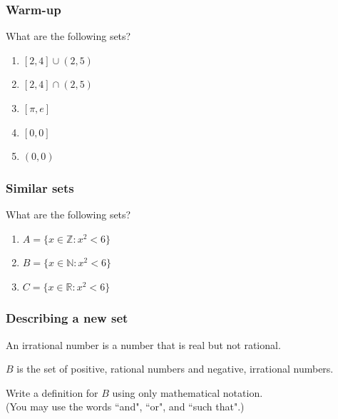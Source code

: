 \documentclass[14pt]{beamer}
\date{}
\title{}
\author{}
\begin{document}
\begin{frame}
	\frametitle{Warm-up}

	What are the following sets?

	\begin{enumerate}
		\item $[2,4] \cup (2,5)$

		\item $[2,4] \cap (2,5)$

		\item $[\pi,e]$

		\item $[0,0]$

		\item $(0,0)$
	\end{enumerate}
\end{frame}

\begin{frame}
	\frametitle{Similar sets}

	What are the following sets?

	\begin{enumerate}
		\item $\displaystyle A = \{ x \in \mathbb{Z}: x^{2}< 6\}$

		\item $\displaystyle B = \{ x \in \mathbb{N}: x^{2}< 6\}$

		\item $\displaystyle C = \{ x \in \mathbb{R}: x^{2}< 6\}$
	\end{enumerate}
\end{frame}

\begin{frame}
	\frametitle{Describing a new set}

	An irrational number is a number that is real but not rational.

	$B$ is the set of positive, rational numbers and negative, irrational numbers.

	Write a definition for $B$ using only mathematical notation. \\ (You may use
	the words ``and", ``or", and ``such that".)
\end{frame}
\end{document}
